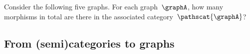 
\vfill\pagebreak

\begin{widepar}
    \begin{gradedexercise}
        \label{ex:HowManyMorphisms}
        Consider the following five graphs.
        For each graph~$\graphA$, how many morphisms in total are there in the associated category~$\pathscat{\graphA}$?
    \end{gradedexercise}
\end{widepar}


\subsection[Categories from graphs]{From (semi)categories to graphs}
\label{sec:graphsfromcats}




